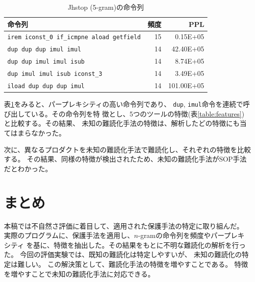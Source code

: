 \documentclass[12pt,twoside]{jbook}
\begin{document}
\begin{table}[t]
  \centering
  \footnotesize{
    \caption{Jhstop (5-gram)の命令列}\label{table:jhstop}
  \begin{tabular}{l|r|r}
   命令列 & 頻度 & PPL\\ \hline
    \texttt{irem iconst\_0 if\_icmpne aload getfield} & 15 &   0.15E+05 \\
    \texttt{dup dup dup imul imul}                    & 14 &  42.40E+05 \\
    \texttt{dup dup imul imul isub}                   & 14 &   8.74E+05 \\
    \texttt{dup imul imul isub iconst\_3}             & 14 &   3.49E+05 \\
    \texttt{iload dup dup dup imul}                   & 14 & 101.00E+05 \\
    \end{tabular}}
\end{table}

表\ref{table:jhstop}をみると、パープレキシティの高い命令列であり、
\texttt{dup}, \texttt{imul}命令を連続で呼び出している。その命令列を特
徴とし、5つのツールの特徴(表\ref{table:features})と比較する。その結果、
未知の難読化手法の特徴は、解析したどの特徴にも当てはまらなかった。

次に、異なるプロダクトを未知の難読化手法で難読化し、それぞれの特徴を比較する。
その結果、同様の特徴が検出されたため、未知の難読化手法がSOP手法だとわかった。

\chapter{まとめ}

本稿では不自然さ評価に着目して、適用された保護手法の特定に取り組んだ。
実際のプログラムに、保護手法を適用し、$n$-gramの命令列を頻度やパープレキシティ
を基に、特徴を抽出した。その結果をもとに不明な難読化の解析を行った。
今回の評価実験では、既知の難読化は特定しやすいが、
未知の難読化の特定は難しい。
この解決策として、難読化手法の特徴を増やすことである。
特徴を増やすことで未知の難読化手法に対応できる。





\appendix
\end{document}
